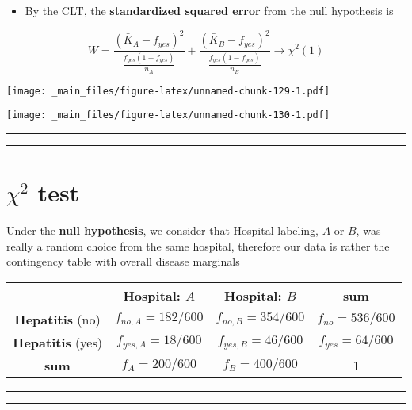 \documentclass[
]{book}
\providecommand{\tightlist}{%
  \setlength{\itemsep}{0pt}\setlength{\parskip}{0pt}}
\begin{document}
\begin{itemize}
\tightlist
\item
  By the CLT, the \textbf{standardized squared error} from the null hypothesis is
\end{itemize}

\[W= \frac{(\bar{K}_A-f_{yes})^2}{\frac{f_{yes}(1-f_{yes})}{n_A}} + \frac{(\bar{K}_B-f_{yes})^2}{\frac{f_{yes}(1-f_{yes})}{n_B}}\rightarrow \chi^2(1)\]

\texttt{[image: \_main\_files/figure-latex/unnamed-chunk-129-1.pdf]}

\texttt{[image: \_main\_files/figure-latex/unnamed-chunk-130-1.pdf]}

\begin{center}\rule{0.5\linewidth}{0.5pt}\end{center}

\begin{center}\rule{0.5\linewidth}{0.5pt}\end{center}

\hypertarget{chi2-test-1}{%
\section{\texorpdfstring{\(\chi^2\) test}{\textbackslash chi\^{}2 test}}\label{chi2-test-1}}

Under the \textbf{null hypothesis}, we consider that Hospital labeling, \(A\) or \(B\), was really a random choice from the same hospital, therefore our data is rather the contingency table with overall disease marginals

\begin{longtable}[]{@{}cccc@{}}
\toprule
& Hospital: \(A\) & Hospital: \(B\) & sum \\
\midrule
\endhead
\textbf{Hepatitis} (no) & \(f_{no,A}=182/600\) & \(f_{no,B}=354/600\) & \(f_{no}=536/600\) \\
\textbf{Hepatitis} (yes) & \(f_{yes,A}=18/600\) & \(f_{yes,B}=46/600\) & \(f_{yes}=64/600\) \\
\textbf{sum} & \(f_{A}=200/600\) & \(f_{B}=400/600\) & 1 \\
\bottomrule
\end{longtable}

\begin{center}\rule{0.5\linewidth}{0.5pt}\end{center}

\begin{center}\rule{0.5\linewidth}{0.5pt}\end{center}
\end{document}
